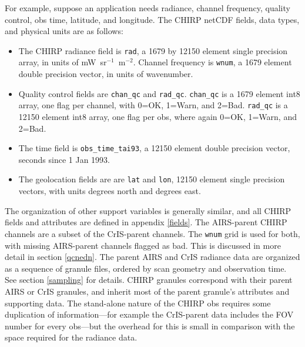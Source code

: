 \documentclass[11pt]{article}
\newcommand {\radunits} {\hbox{mW sr$^{-1}$ m$^{-2}$}}
\begin{document}
For example, suppose an application needs radiance, channel
frequency, quality control, obs time, latitude, and longitude.
The CHIRP netCDF fields, data types, and physical units are as
follows:

\begin{itemize}

\item
The CHIRP radiance field is \texttt{rad}, a 1679 by 12150 element
single precision array, in units of \radunits.  Channel frequency is
\texttt{wnum}, a 1679 element double precision vector, in units of
wavenumber.

\item
Quality control fields are \texttt{chan\_qc} and \texttt{rad\_qc}.
\texttt{chan\_qc} is a 1679 element int8 array, one flag per
channel, with 0=OK, 1=Warn, and 2=Bad.  \texttt{rad\_qc} is a 12150
element int8 array, one flag per obs, where again 0=OK, 1=Warn, and
2=Bad.

\item
The time field is \texttt{obs\_time\_tai93}, a 12150 element double
precision vector, seconds since 1 Jan 1993.

\item
The geolocation fields are are \texttt{lat} and \texttt{lon}, 12150
element single precision vectors, with units degrees north and
degrees east.

\end{itemize}

The organization of other support variables is generally similar, and
all CHIRP fields and attributes are defined in appendix \ref{fields}.
The AIRS-parent CHIRP channels are a subset of the CrIS-parent
channels.  The \texttt{wnum} grid is used for both, with missing
AIRS-parent channels flagged as bad.  This is discussed in more
detail in section \ref{qcnedn}.  The parent AIRS and CrIS radiance
data are organized as a sequence of granule files, ordered by scan
geometry and observation time.  See section \ref{sampling} for
details.  CHIRP granules correspond with their parent AIRS or CrIS
granules, and inherit most of the parent granule's attributes and
supporting data.  The stand-alone nature of the CHIRP obs requires
some duplication of information---for example the CrIS-parent data
includes the FOV number for every obs---but the overhead for this is
small in comparison with the space required for the radiance data.
\end{document}
